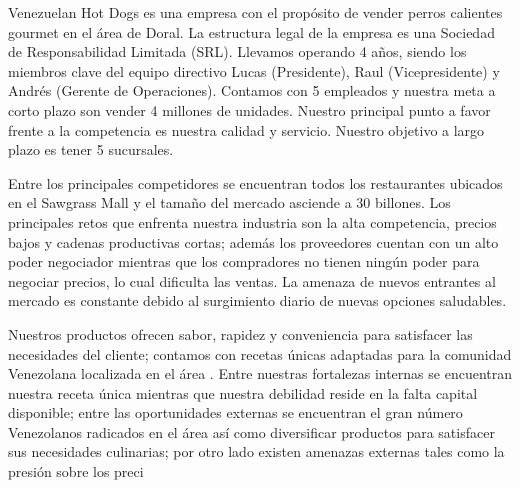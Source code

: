 

Venezuelan Hot Dogs es una empresa con el propósito de vender perros calientes gourmet en el área de Doral. La estructura legal de la empresa es una Sociedad de Responsabilidad Limitada (SRL). Llevamos operando 4 años, siendo los miembros clave del equipo directivo Lucas (Presidente), Raul (Vicepresidente) y Andrés (Gerente de Operaciones). Contamos con 5 empleados y nuestra meta a corto plazo son vender 4 millones de unidades. Nuestro principal punto a favor frente a la competencia es nuestra calidad y servicio. Nuestro objetivo a largo plazo es tener 5 sucursales. 

Entre los principales competidores se encuentran todos los restaurantes ubicados en el Sawgrass Mall y el tamaño del mercado asciende a 30 billones. Los principales retos que enfrenta nuestra industria son la alta competencia, precios bajos y cadenas productivas cortas; además los proveedores cuentan con un alto poder negociador mientras que los compradores no tienen ningún poder para negociar precios, lo cual dificulta las ventas. La amenaza de nuevos entrantes al mercado es constante debido al surgimiento diario de nuevas opciones saludables. 

Nuestros productos ofrecen sabor, rapidez y conveniencia para satisfacer las necesidades del cliente; contamos con recetas únicas adaptadas para la comunidad Venezolana localizada en el área . Entre nuestras fortalezas internas se encuentran nuestra receta única mientras que nuestra debilidad reside en la falta capital disponible; entre las oportunidades externas se encuentran el gran número Venezolanos radicados en el área así como diversificar productos para satisfacer sus necesidades culinarias; por otro lado existen amenazas externas tales como la presión sobre los preci